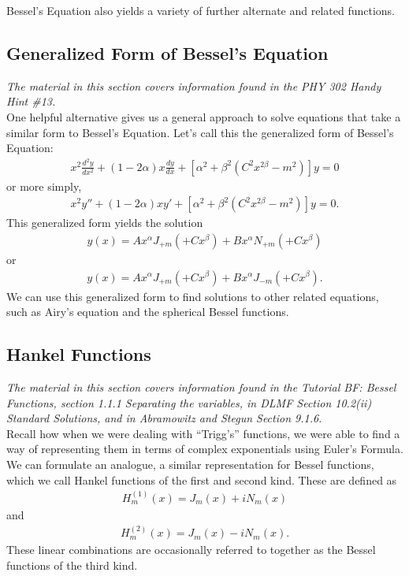 \documentclass[11pt]{report}
\newcommand{\fpar}[1]{\left({#1}\right)}
\begin{document}

Bessel's Equation also yields a variety of further alternate and related functions. 

\subsection{Generalized Form of Bessel's Equation}

\emph{The material in this section covers information found in the PHY 302 Handy Hint \#13.}\\

One helpful alternative gives us a general approach to solve equations that take a similar form to Bessel's Equation. Let's call this the generalized form of Bessel's Equation:
    \begin{align}
        x^2\frac{d^2 y}{dx^2} + (1-2\alpha)x\frac{d y}{dx} + \left[\alpha^2+\beta^2(C^2x^{2\beta}-m^2)\right]y=0
    \end{align}
or more simply,
    \begin{align*}
        x^2y'' + (1-2\alpha)xy' + \left[\alpha^2+\beta^2(C^2x^{2\beta}-m^2)\right]y=0.
    \end{align*}
This generalized form yields the solution
    \begin{align}
        y(x) = Ax^{\alpha}J_{+m}(+Cx^{\beta}) + Bx^{\alpha}N_{+m}(+Cx^{\beta})
    \end{align}
or
    \begin{align}
        y(x) = Ax^{\alpha}J_{+m}(+Cx^{\beta}) + Bx^{\alpha}J_{-m}(+Cx^{\beta}).
    \end{align}
We can use this generalized form to find solutions to other related equations, such as Airy's equation and the spherical Bessel functions. 
    
\subsection{Hankel Functions}

\emph{The material in this section covers information found in the Tutorial BF: Bessel Functions, section 1.1.1 Separating the variables, in DLMF Section 10.2(ii) Standard Solutions, and in Abramowitz and Stegun Section 9.1.6.}\\

Recall how when we were dealing with ``Trigg's'' functions, we were able to find a way of representing them in terms of complex exponentials using Euler's Formula. We can formulate an analogue, a similar representation for Bessel functions, which we call Hankel functions of the first and second kind. These are defined as
    \begin{align}
        H^{(1)}_m(x) = J_m(x)+iN_m\fpar{x}
    \end{align}
and
    \begin{align}
        H^{(2)}_m(x) = J_m(x)-iN_m\fpar{x}.
    \end{align}
These linear combinations are occasionally referred to together as the Bessel functions of the third kind. 
\end{document}

